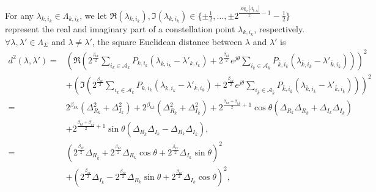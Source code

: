 \documentclass[12pt, draftclsnofoot, onecolumn]{IEEEtran}
\newcommand{\msf}[1]{\mathsf{#1}}
\theoremstyle{definition}
\begin{document}
For any $\lambda_{k,i_k} \in \Lambda_{k,i_k}$, we let $\Re(\lambda_{k,i_k}),\Im(\lambda_{k,i_k}) \in \{\pm\frac{1}{2},\ldots,\pm 2^{\frac{\log_2|\Lambda_{k,i_k}|}{2}-1}-\frac{1}{2}\}$ represent the real and imaginary part of a constellation point $\lambda_{k,i_k}$, respectively. $\forall \lambda ,\lambda' \in \Lambda_{\Sigma}$ and $\lambda \neq \lambda'$, the square Euclidean distance between $\lambda$ and $\lambda'$ is
\begin{align}\label{eq:dmin2L}
d^2(\lambda,\lambda')=&\left(\Re\left(2^{\frac{\beta_{kk}}{2}}\sum_{i_k \in\mathcal{A}_k}P_{k,i_k}(\lambda_{k,i_k}-\lambda'_{k,i_k}) + 2^{\frac{\beta_{k\bar{k}}}{2}}e^{j \theta}\sum_{i_{\bar{k}} \in\mathcal{A}_{\bar{k}}}P_{{\bar{k}},i_{\bar{k}}}(\lambda_{{\bar{k}},i_{\bar{k}}}-\lambda'_{{\bar{k}},i_{\bar{k}}})\right)\right)^2\nonumber \\
&+\left(\Im\left(2^{\frac{\beta_{kk}}{2}}\sum_{i_k \in\mathcal{A}_k}P_{k,i_k}(\lambda_{k,i_k}-\lambda'_{k,i_k}) + 2^{\frac{\beta_{k\bar{k}}}{2}}e^{j \theta}\sum_{i_{\bar{k}} \in\mathcal{A}_{\bar{k}}}P_{{\bar{k}},i_{\bar{k}}}(\lambda_{{\bar{k}},i_{\bar{k}}}-\lambda'_{{\bar{k}},i_{\bar{k}}})\right)\right)^2 \nonumber \\
=& 2^{\beta_{kk}}(\Delta_{R_k}^2+ \Delta_{I_k}^2) + 2^{\beta_{k\bar{k}}}(\Delta_{R_{\bar{k}}}^2+ \Delta_{I_{\bar{k}}}^2) %
+2^{\frac{\beta_{kk}+\beta_{k\bar{k}}}{2}+1}\cos\theta(\Delta_{R_k}\Delta_{R_{\bar{k}}}+\Delta_{I_k}\Delta_{I_{\bar{k}}})\nonumber \\
&+2^{\frac{\beta_{kk}+\beta_{k\bar{k}}}{2}+1}\sin\theta(\Delta_{R_{\bar{k}}}\Delta_{I_k}-\Delta_{R_k}\Delta_{I_{\bar{k}}}),\nonumber \\
=&(2^{\frac{\beta_{k{\bar{k}}}}{2}}\Delta_{R_{\bar{k}}}+2^{\frac{\beta_{kk}}{2}}\Delta_{R_k}\cos\theta+2^{\frac{\beta_{kk}}{2}}\Delta_{I_k}\sin\theta)^2\nonumber \\
&+(2^{\frac{\beta_{k\bar{k}}}{2}}\Delta_{I_{\bar{k}}} -2^{\frac{\beta_{kk}}{2}}\Delta_{R_k}\sin\theta+2^{\frac{\beta_{kk}}{2}}\Delta_{I_k}\cos\theta)^2,
\end{align}
\end{document}
